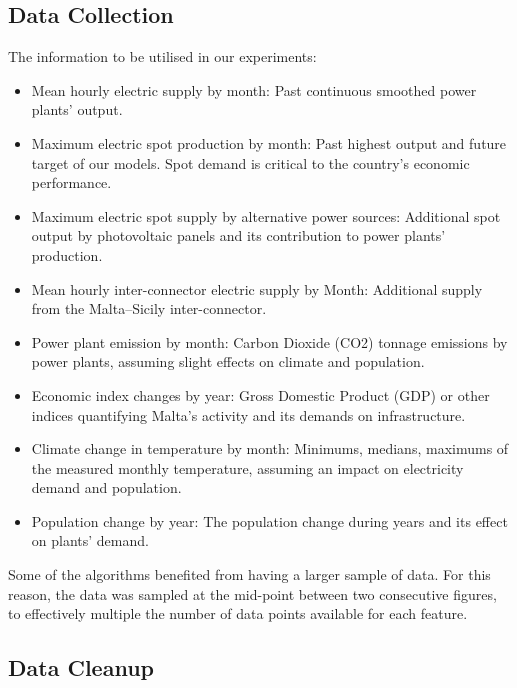 \documentclass{ieeeaccess}
\begin{document}
\subsection{Data Collection}

The information to be utilised in our experiments:

\begin{itemize}
    \item Mean hourly electric supply by month: Past continuous smoothed power plants' output\cite{elec_supp_src}.
    \item Maximum electric spot production by month: Past highest output and future target of our models. Spot demand is critical to the country's economic performance\cite{elec_supp_src}.
    \item Maximum electric spot supply by alternative power sources: Additional spot output by photovoltaic panels and its contribution to power plants' production\cite{elec_supp_src}.
    \item Mean hourly inter-connector electric supply by Month: Additional supply from the Malta–Sicily inter-connector\cite{elec_supp_src}.
    \item Power plant emission by month: Carbon Dioxide (CO2) tonnage emissions by power plants, assuming slight effects on climate and population\cite{emmisions_src}.
    \item Economic index changes by year: Gross Domestic Product (GDP) or other indices quantifying Malta's activity and its demands on infrastructure\cite{gdp_src}.
    \item Climate change in temperature by month: Minimums, medians, maximums of the measured monthly temperature, assuming an impact on electricity demand and population\cite{meteostat_api, eu_climate_src}.
    \item Population change by year: The population change during years and its effect on plants' demand\cite{gdp_src}.
\end{itemize}

Some of the algorithms benefited from having a larger sample of data. For this reason, the data was sampled at the mid-point between two consecutive figures, to effectively multiple the number of data points available for each feature.

\subsection{Data Cleanup}
\end{document}
